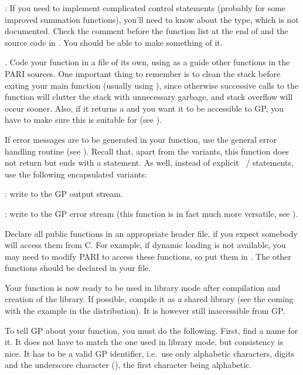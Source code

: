 : If you need to implement complicated control statements
(probably for some improved summation functions), you'll need to know about
the  type, which is not documented. Check the comment before
the function list at the end of  and the source code
in . You should be able to make something of it.
\smallskip

.
\noindent
Code your function in a file of its own, using as a guide other functions
in the PARI sources. One important thing to remember is to clean the stack
before exiting your main function (usually using ), since
otherwise successive calls to the function will clutter the stack with
unnecessary garbage, and stack overflow will occur sooner. Also, if it
returns a  and you want it to be accessible to GP, you have to
make sure this  is suitable for  (see
).

If error messages are to be generated in your function, use the general
error handling routine  (see ). Recall that, apart
from the  variants, this function does not return but ends with
a  statement. As well, instead of explicit ~/
 statements, use the following encapsulated variants:

: write  to the GP output stream.

: write  to the GP error stream (this
function is in fact much more versatile, see ).

Declare all public functions in an appropriate header file, if you
expect somebody will access them from C.  For example, if dynamic
loading is not available, you may need to modify PARI to access these
functions, so put them in . The other functions should
be declared  in your file.

Your function is now ready to be used in library mode after compilation and
creation of the library. If possible, compile it as a shared library (see
the  coming with the  example in the
distribution). It is however still inaccessible from GP.\smallskip


To tell GP about your function, you must do the following. First, find a
name for it. It does not have to match the one used in library mode, but
consistency is nice. It has to be a valid GP identifier, i.e.~use only
alphabetic characters, digits and the underscore character (\kbd{\_}), the
first character being alphabetic.

